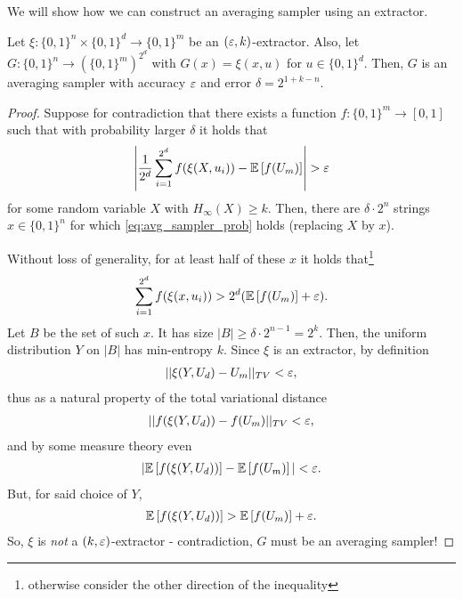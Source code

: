 We will show how we can construct an averaging sampler using an extractor.
\begin{theorem}
    Let $\xi : \{0,1\}^n \times \{0,1\}^d \rightarrow \{0,1\}^m$
    be an $(\varepsilon, k)$-extractor.
    Also, let $G : \{0,1\}^n \rightarrow (\{0,1\}^m)^{2^d}$ with $G(x) = \xi(x,u)$ for $u \in \{0,1\}^d$.
    Then, $G$ is an averaging sampler with accuracy $\varepsilon$ and error $\delta = 2^{1+k-n}$.
\end{theorem}
\begin{proof}
    Suppose for contradiction that there exists a function $f : \{0,1\}^m \rightarrow [0,1]$
    such that with probability larger $\delta$ it holds that
    \begin{align}\label{eq:avg_sampler_prob}
        \left| \frac{1}{2^d} \sum_{i=1}^{2^d} f(\xi (X, u_i)) - \mathbb{E}\left[f(U_m)\right] \right| > \varepsilon
    \end{align}
    for some random variable $X$ with $H_\infty(X) \geq k$.
    Then, there are $\delta \cdot 2^n$ strings $x \in \{0,1\}^n$
    for which \eqref{eq:avg_sampler_prob} holds (replacing $X$ by $x$).

    Without loss of generality, for at least half of these $x$ it holds that\footnote{otherwise consider the other direction of the inequality}
    \begin{align}\label{eq:avg_sampler_concrete_x}
        \sum_{i=1}^{2^d} f(\xi (x, u_i)) > 2^d (\mathbb{E}\left[f(U_m)\right] + \varepsilon).
    \end{align}
    Let $B$ be the set of such $x$.
    It has size $|B| \geq \delta \cdot 2^{n-1} = 2^k$.
    Then, the uniform distribution $Y$ on $|B|$ has min-entropy $k$.
    Since $\xi$ is an extractor, by definition
    \begin{align*}
        || \xi(Y, U_d) - U_m ||_{TV} < \varepsilon,
    \end{align*}
    thus as a natural property of the total variational distance
    \begin{align*}
        || f(\xi(Y, U_d)) - f(U_m) ||_{TV} < \varepsilon,
    \end{align*}
    and by some measure theory even
    \begin{align*}
        | \mathbb{E}\left[f(\xi(Y, U_d))\right] - \mathbb{E}\left[f(U_m)\right] | < \varepsilon.
    \end{align*}
    But, for said choice of $Y$,
    \begin{align*}
        \mathbb{E}\left[f(\xi(Y, U_d))\right] > \mathbb{E}\left[f(U_m)\right] + \varepsilon.
    \end{align*}
    So, $\xi$ is \emph{not} a $(k,\varepsilon)$-extractor - contradiction, $G$ must be an averaging sampler!
\end{proof}
